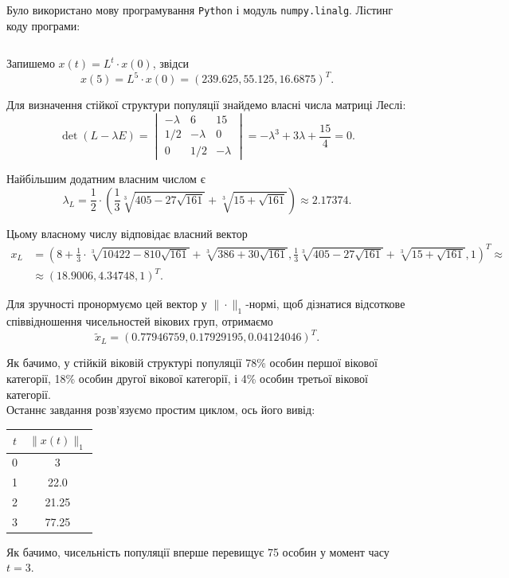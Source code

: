Було використано мову програмування \texttt{Python} і модуль \texttt{numpy.linalg}. Лістинг коду програми:
\inputminted{python}{2.py}

Запишемо $x(t) = L^t \cdot x(0)$, звідси \[ x(5) = L^5 \cdot x(0) = (239.625, 55.125, 16.6875)^T. \]

Для визначення стійкої структури популяції знайдемо власні числа матриці Леслі: \[ \det (L - \lambda E) = \begin{vmatrix} -\lambda & 6 & 15 \\ 1 / 2 & -\lambda & 0 \\ 0 & 1 / 2 & -\lambda \end{vmatrix} = - \lambda^3 + 3 \lambda + \frac{15}{4} = 0. \]

Найбільшим додатним власним числом є \[ \lambda_L = \frac{1}{2} \cdot \left( \frac{1}{3} \sqrt[3]{405 - 27 \sqrt{161}} + \sqrt[3]{15 + \sqrt{161}} \right) \approx 2.17374. \]

Цьому власному числу відповідає власний вектор \begin{align*} x_L &= \left( 8 + \frac{1}{3} \cdot \sqrt[3]{10422 - 810\sqrt{161}} + \sqrt[3]{386 + 30 \sqrt{161}}, \frac{1}{3} \sqrt[3]{405 - 27 \sqrt{161}}+ \sqrt[3]{15 + \sqrt{161}}, 1 \right)^T \approx \\ &\approx (18.9006, 4.34748, 1)^T. \end{align*}

Для зручності пронормуємо цей вектор у $\|\cdot\|_1$-нормі, щоб дізнатися відсоткове співвідношення чисельностей вікових груп, отримаємо \[ \tilde x_L = (0.77946759, 0.17929195, 0.04124046)^T. \]

Як бачимо, у стійкій віковій структурі популяції 78\% особин першої вікової категорії, 18\% особин другої вікової категорії, і 4\% особин третьої вікової категорії. \\

Останнє завдання розв'язуємо простим циклом, ось його вивід:
\begin{table}[H]
	\centering
	\begin{tabular}{|c|c|} \hline
		$t$ & $\|x(t)\|_1$ \\ \hline
		0 & 3 \\ \hline
		1 & 22.0 \\ \hline
		2 & 21.25 \\ \hline
		3 & 77.25 \\ \hline
	\end{tabular}
\end{table}

Як бачимо, чисельність популяції вперше перевищує 75 особин у момент часу $t = 3$.

